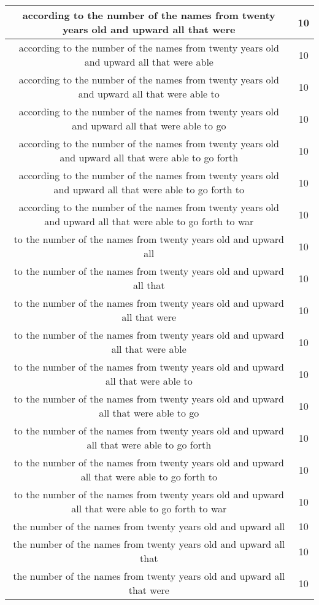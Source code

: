 \begin{center}
\begin{longtable}{|c|c|}
according to the number of the names from twenty years old and upward all that were & 10\\ \hline 
according to the number of the names from twenty years old and upward all that were able & 10\\ \hline 
according to the number of the names from twenty years old and upward all that were able to & 10\\ \hline 
according to the number of the names from twenty years old and upward all that were able to go & 10\\ \hline 
according to the number of the names from twenty years old and upward all that were able to go forth & 10\\ \hline 
according to the number of the names from twenty years old and upward all that were able to go forth to & 10\\ \hline 
according to the number of the names from twenty years old and upward all that were able to go forth to war & 10\\ \hline 
to the number of the names from twenty years old and upward all & 10\\ \hline 
to the number of the names from twenty years old and upward all that & 10\\ \hline 
to the number of the names from twenty years old and upward all that were & 10\\ \hline 
to the number of the names from twenty years old and upward all that were able & 10\\ \hline 
to the number of the names from twenty years old and upward all that were able to & 10\\ \hline 
to the number of the names from twenty years old and upward all that were able to go & 10\\ \hline 
to the number of the names from twenty years old and upward all that were able to go forth & 10\\ \hline 
to the number of the names from twenty years old and upward all that were able to go forth to & 10\\ \hline 
to the number of the names from twenty years old and upward all that were able to go forth to war & 10\\ \hline 
the number of the names from twenty years old and upward all & 10\\ \hline 
the number of the names from twenty years old and upward all that & 10\\ \hline 
the number of the names from twenty years old and upward all that were & 10\\ \hline 

\end{longtable}
\end{center}
